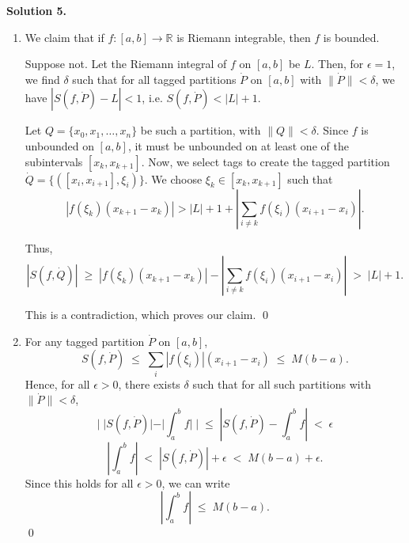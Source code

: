 \documentclass[10pt]{article}
\begin{document}
        \textbf{Solution 5.}
        \begin{enumerate}
                \item We claim that if $f\colon [a, b] \to \mathbb{R}$ is Riemann integrable, then $f$ is bounded.

                Suppose not. Let the Riemann integral of $f$ on $[a, b]$ be $L$. Then, for $\epsilon = 1$, we find $\delta$ such that
                for all tagged partitions $\dot{P}$ on $[a, b]$ with $\|\dot{P}\| < \delta$, we have $|S(f, \dot{P}) - L| < 1$,
                i.e. $S(f, \dot{P}) < |L| + 1$.

                Let $Q = \{x_0, x_1, \ldots, x_n\}$ be such a partition, with $\|Q\| < \delta$. Since $f$ is unbounded on $[a, b]$,
                it must be unbounded on at least one of the subintervals $[x_k, x_{k + 1}]$. Now, we select tags to create the tagged partition
                $\dot{Q} = \{([x_{i}, x_{i + 1}], \xi_i)\}$. We choose $\xi_k \in [x_k, x_{k + 1}]$ such that
                \[
                |f(\xi_k)(x_{k + 1} - x_{k})| > |L| + 1 + |\sum_{i \neq k} f(\xi_i)(x_{i + 1} - x_i)|.
                \]

                Thus,
                \[
                |S(f, \dot{Q})| \;\ge\; |f(\xi_k)(x_{k + 1} - x_k)| - |\sum_{i \neq k} f(\xi_i)(x_{i + 1} - x_i)| \;>\; |L| + 1.
                \]

                This is a contradiction, which proves our claim. \qed\\

                \item For any tagged partition $\dot{P}$ on $[a, b]$,
                \[S(f, \dot{P}) \;\le\; \sum_i |f(\xi_i)|(x_{i + 1} - x_{i}) \;\le\; M(b - a).\]
                Hence, for all $\epsilon > 0$, there exists $\delta$ such that for all such partitions with $\|\dot{P}\| < \delta$,
                \[ | \;|S(f, \dot{P})| - |\int_a^b f|\; | \;\le\; | S(f, \dot{P}) - \int_a^b f| \;<\; \epsilon\]
                \[
                \left|\int_a^b f \right| \;<\; |S(f, \dot{P})| + \epsilon \;<\; M(b - a) + \epsilon.
                \]
                Since this holds for all $\epsilon > 0$, we can write
                \[\left|\int_a^b f \right| \;\le\; M(b - a).\]\qed
        \end{enumerate}
\end{document}
